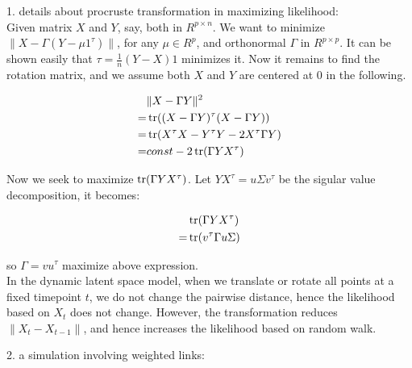 \documentclass{article}
\begin{document}
1. details about procruste transformation in maximizing likelihood:\\
Given matrix $X$ and $Y$, say, both in $R^{p\times n}$. We want to minimize $\| X - \Gamma(Y - \mu 1^{\tau})\|$, for any $\mu \in R^p$, and orthonormal $\Gamma$ in $R^{p\times p}$. It can be shown easily that $\tau = \frac{1}{n}(Y - X)1$ minimizes it. Now it remains to find the rotation matrix, and we assume both $X$ and $Y$ are centered at $0$ in the following.

\begin{align*}
&\| X - \Gamma Y\|^2\\
=&\operatorname{tr} ((X - \Gamma Y)^{\tau}(X - \Gamma Y))\\
=&\operatorname{tr} (X^{\tau} X - Y^{\tau} Y - 2 X^{\tau}\Gamma Y)\\
=& const - 2 \operatorname{tr} (\Gamma Y X^{\tau})
\end{align*}

Now we seek to maximize $\operatorname{tr} (\Gamma Y X^{\tau})$. Let $Y X^{\tau} = u\Sigma v^{\tau}$ be the sigular value decomposition, it becomes:

\begin{align*}
&\operatorname{tr}(\Gamma Y X^{\tau})\\
=&\operatorname{tr}(v^{\tau}\Gamma u \Sigma)
\end{align*}

so $\Gamma = vu^{\tau}$ maximize above expression.\\
In the dynamic latent space model, when we translate or rotate all points at a fixed timepoint $t$, we do not change the pairwise distance, hence the likelihood based on $X_t$ does not change. However, the transformation reduces $\| X_t - X_{t-1}\|$, and hence increases the likelihood based on random walk. 

2. a simulation involving weighted links:
\end{document}
